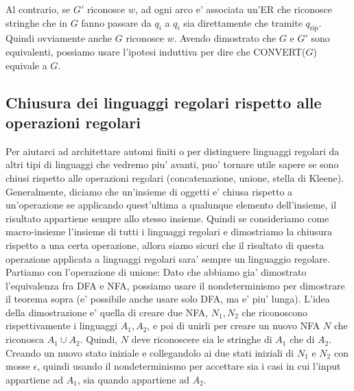 {\begin{itemize}
      Al contrario, se $ G' $ riconosce $ w $, ad ogni arco e' associata un'ER che riconosce stringhe che in $ G $ fanno passare da $ q_i $ a $ q_i $ sia direttamente che tramite $ q_{\text{rip}} $. Quindi ovviamente anche $ G $ riconosce $ w $. Avendo dimostrato che $ G $ e $ G' $ sono equivalenti, possiamo usare l'ipotesi induttiva per dire che CONVERT($ G $) equivale a $ G $.
  \end{itemize}
}


\subsection{Chiusura dei linguaggi regolari rispetto alle operazioni regolari}
Per aiutarci ad architettare automi finiti o per distinguere linguaggi regolari da altri tipi di linguaggi che vedremo piu' avanti, puo' tornare utile sapere se sono chiusi rispetto alle operazioni regolari (concatenazione, unione, stella di Kleene). Generalmente, diciamo che un'insieme di oggetti e' chiusa rispetto a un'operazione se applicando quest'ultima a qualunque elemento dell'insieme, il risultato appartiene sempre allo stesso insieme. Quindi se consideriamo come macro-insieme l'insieme di tutti i linguaggi regolari e dimostriamo la chiusura rispetto a una certa operazione, allora siamo sicuri che il risultato di questa operazione applicata a linguaggi regolari sara' sempre un linguaggio regolare. Partiamo con l'operazione di unione:
Dato che abbiamo gia' dimostrato l'equivalenza fra DFA e NFA, possiamo usare il nondeterminismo per dimostrare il teorema sopra (e' possibile anche usare solo DFA, ma e' piu' lunga). L'idea della dimostrazione e' quella di creare due NFA, $ N_1, N_2 $ che riconoscono rispettivamente i linguaggi $ A_1, A_2 $, e poi di unirli per creare un nuovo NFA $ N $ che riconosca $ A_1 \cup A_2 $. Quindi, $ N $ deve riconoscere sia le stringhe di $ A_1 $ che di $ A_2 $. Creando un nuovo stato iniziale e collegandolo ai due stati iniziali di $ N_1 $ e $ N_2 $ con mosse $ \epsilon $, quindi usando il nondeterminismo per accettare sia i casi in cui l'input appartiene ad $ A_1 $, sia quando appartiene ad $ A_2 $. 
